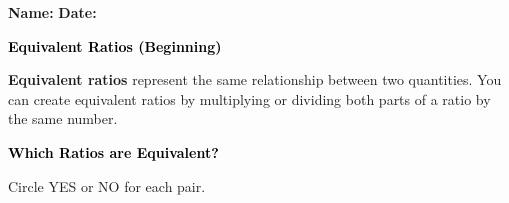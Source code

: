 \documentclass[12pt, letterpaper, fleqn]{article}
\begin{document}
\textbf{Name:} \underline{\hspace{5cm}}
\hfill
\textbf{Date:} \underline{\hspace{3cm}}\\

\begin{tcolorbox}[colback=customteal!20]
    \large\textcolor{black}{\textbf{Equivalent Ratios (Beginning)}}
\end{tcolorbox}

\vspace{3mm}

\noindent
\textbf{Equivalent ratios} represent the same relationship between two quantities. You can create equivalent ratios by multiplying or dividing both parts of a ratio by the same number.

\vspace{4mm}

\begin{tcolorbox}[colback=customteal!20]
\large\textcolor{black}{\textbf{Which Ratios are Equivalent?}}
\end{tcolorbox}

\noindent
Circle YES or NO for each pair.

\vspace{3mm}
\end{document}
